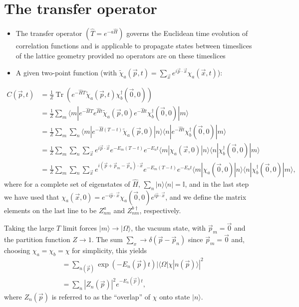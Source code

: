 \section{The transfer operator}
\begin{itemize}
    \item The transfer operator $(\hat{T} = e^{- a \hat{H}})$ governs the Euclidean time evolution of correlation functions and is applicable to propagate states between timeslices of the lattice geometry provided no operators are on these timeslices
    \item A given two-point function (with $\tilde \chi_a(\vec{p}, t) = \sum_{\vec{x}} e^{i \vec{p} \cdot \vec{x}} \chi_a(\vec{x}, t)$):
\end{itemize}
\begin{align}
    C(\vec{p}, t) &= \frac{1}{Z}\operatorname{Tr}\left(e^{-\hat{H} T}\tilde{\chi}_a(\vec{p}, t) \chi_b^\dagger(\vec{0}, 0) \right) \nonumber \\
    &= \frac{1}{Z}\sum_m \langle m | e^{- \hat{H} T}e^{\hat{H} t} \tilde{\chi}_a(\vec{p}, 0) e^{- \hat{H} t} \chi_b^\dagger(\vec{0}, 0)|m\rangle \nonumber \\
    &= \frac{1}{Z}\sum_m \sum_n \langle m |e^{-\hat{H}(T-t)}\tilde{\chi}_a(\vec{p},0) | n \rangle \langle n |e^{- \hat{H} t} \chi_b^\dagger(\vec{0},0) | m \rangle \nonumber \\
    &= \frac{1}{Z}\sum_m \sum_n \sum_{\vec{x}}e^{i \vec{p} \cdot \vec{x}}e^{-E_m(T - t)} e^{-E_n t} \langle m | \chi_a(\vec{x}, 0) | n \rangle \langle n | \chi_b^\dagger(\vec{0}, 0) | m \rangle \nonumber \\
    &= \frac{1}{Z}\sum_m \sum_n \sum_{\vec{x}} e^{i (\vec{p} + \vec{p}_m - \vec{p}_n)\cdot \vec{x}}e^{-E_m(T - t)} e^{-E_n t} \langle m | \chi_a(\vec{0},0) | n \rangle \langle n | \chi_b^\dagger(\vec{0},0)|m \rangle,
    \label{eq:c2}
\end{align}
where for a complete set of eigenstates of $\hat H$, $\sum_n |n\rangle\langle n|=\mathbb{I}$, and in the last step we have used that $\chi_a(\vec{x}, 0) = e^{-i \hat{p} \cdot \vec{x}} \chi_a(\vec{0}, 0) e^{i \hat{p} \cdot \vec{x}}$, and we define the matrix elements on the last line to be $Z_{nm}^a$ and $Z_{nm}^{b \dagger}$, respectively.

Taking the large $T$ limit forces $|m \rangle \rightarrow |\Omega \rangle$, the vacuum state, with $\vec{p}_m = \vec{0}$ and the partition function $Z \rightarrow 1$. The sum $\sum_x \rightarrow \delta(\vec{p} - \vec{p}_n)$ since $\vec{p}_m = \vec{0}$ and, choosing $\chi_a = \chi_b = \chi$ for simplicity, this yields
\begin{align}
    &= \sum_{n(\vec{p})}\exp(-E_n(\vec{p})t)  | \langle \Omega | \chi | n(\vec{p}) \rangle |^2 \nonumber \\
    &= \sum_n | Z_n(\vec{p})|^2 e^{-E_n(\vec{p})t},
\end{align}
where $Z_n(\vec{p})$ is referred to as the ``overlap'' of $\chi$ onto state $|n\rangle$.

